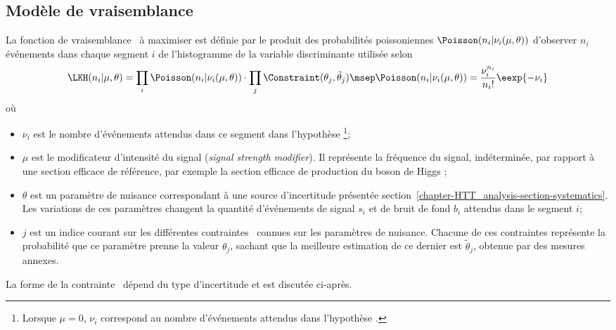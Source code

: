 \subsection{Modèle de vraisemblance}\label{chapter-HTT_analysis-section-signal_extraction-likelihood}
La fonction de vraisemblance \LKH\ à maximiser est définie par
le produit des probabilités poissoniennes $\Poisson (n_i | \nu_i(\mu,\theta))$ d'observer $n_i$ événements dans chaque segment $i$ de l'histogramme de la variable discriminante utilisée
selon
\begin{equation}
\LKH(n_i | \mu,\theta)
=
\prod_i \Poisson(n_i | \nu_i(\mu,\theta))
\cdot
\prod_j \Constraint(\theta_j, \tilde{\theta}_j)
\msep
\Poisson(n_i | \nu_i(\mu,\theta))
=
\frac{\nu_i^{n_i}}{{n_i}!}\eexp{-\nu_i}
\end{equation}
où
\begin{itemize}
\item $\nu_i$ est le nombre d'événements attendus dans ce segment dans l'hypothèse \hypSB\footnote{Lorsque $\mu=0$, $\nu_i$ correspond au nombre d'événements attendus dans l'hypothèse \hypB.};
\item $\mu$ est le modificateur d'intensité du signal (\emph{signal strength modifier}).
Il représente la fréquence du signal, indéterminée, par rapport à une section efficace de référence, par exemple la section efficace de production du boson de Higgs \higgs;
\item $\theta$ est un paramètre de nuisance correspondant à une source d'incertitude présentée section~\ref{chapter-HTT_analysis-section-systematics}.
Les variations de ces paramètres changent la quantité d'événements de signal $s_i$ et de bruit de fond $b_i$ attendus dans le segment $i$;
\item $j$ est un indice courant sur les différentes contraintes \Constraint\ connues sur les paramètres de nuisance.
Chacune de ces contraintes représente la probabilité que ce paramètre prenne la valeur $\theta_j$, sachant que la meilleure estimation de ce dernier est $\tilde{\theta}_j$, obtenue par des mesures annexes.
\end{itemize}
La forme de la contrainte \Constraint\ dépend du type d'incertitude et est discutée ci-après.
